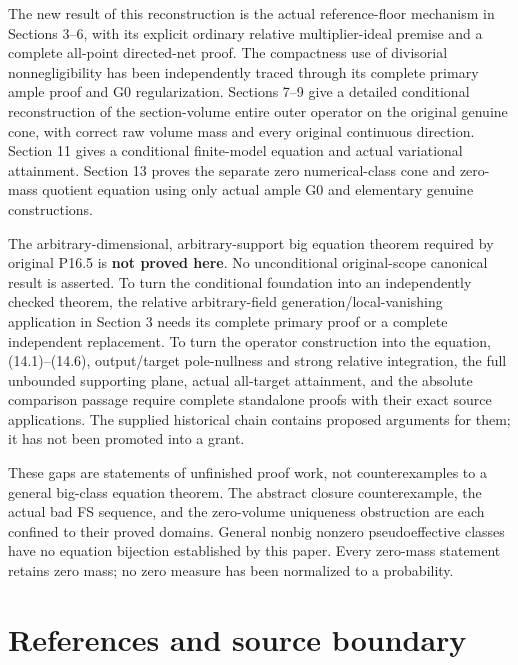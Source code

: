 \documentclass[
  10pt,
]{article}
\begin{document}
The new result of this reconstruction is the actual reference-floor
mechanism in Sections 3--6, with its explicit ordinary relative
multiplier-ideal premise and a complete all-point directed-net proof.
The compactness use of divisorial nonnegligibility has been
independently traced through its complete primary ample proof and G0
regularization. Sections 7--9 give a detailed conditional reconstruction
of the section-volume entire outer operator on the original genuine
cone, with correct raw volume mass and every original continuous
direction. Section 11 gives a conditional finite-model equation and
actual variational attainment. Section 13 proves the separate zero
numerical-class cone and zero-mass quotient equation using only actual
ample G0 and elementary genuine constructions.

The arbitrary-dimensional, arbitrary-support big equation theorem
required by original P16.5 is \textbf{not proved here}. No unconditional
original-scope canonical result is asserted. To turn the conditional
foundation into an independently checked theorem, the relative
arbitrary-field generation/local-vanishing application in Section 3
needs its complete primary proof or a complete independent replacement.
To turn the operator construction into the equation, (14.1)--(14.6),
output/target pole-nullness and strong relative integration, the full
unbounded supporting plane, actual all-target attainment, and the
absolute comparison passage require complete standalone proofs with
their exact source applications. The supplied historical chain contains
proposed arguments for them; it has not been promoted into a grant.

These gaps are statements of unfinished proof work, not counterexamples
to a general big-class equation theorem. The abstract closure
counterexample, the actual bad FS sequence, and the zero-volume
uniqueness obstruction are each confined to their proved domains.
General nonbig nonzero pseudoeffective classes have no equation
bijection established by this paper. Every zero-mass statement retains
zero mass; no zero measure has been normalized to a probability.

\section{References and source
boundary}\label{references-and-source-boundary}
\end{document}
